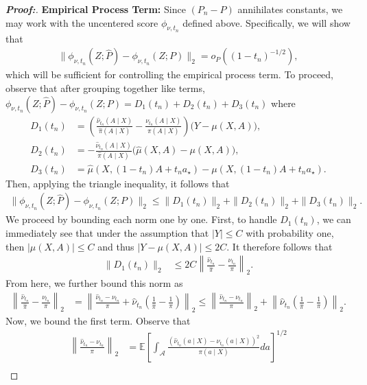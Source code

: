 \documentclass[11pt,twoside]{article}
\theoremstyle{definition}
\theoremstyle{remark}
\begin{document}
\begin{proof}[\textbf{Proof:}]
\textbf{Empirical Process Term:} Since $(P_n-P)$ annihilates constants, we may work with the uncentered score $\phi_{\nu,t_n}$ defined above. Specifically, we will show that
\begin{align*}
    \|\phi_{\nu, t_n}(Z; \widehat{P}) - \phi_{\nu, t_n}(Z; P) \|_2 = o_P\left( (1 - t_n)^{-1/2} \right),
\end{align*}
which will be sufficient for controlling the empirical process term. To proceed, observe that after grouping together like terms, $\phi_{\nu, t_n}(Z; \widehat{P}) - \phi_{\nu, t_n}(Z; P) = D_1(t_n) + D_2(t_n) + D_3(t_n)$  where
\begin{align*}
    D_1(t_n) &= \left(\frac{\widehat{\nu}_{t_n}(A \mid X)}{\widehat{\pi}(A \mid X)} - \frac{\nu_{t_n}(A \mid X)}{\pi(A \mid X)} \right) \Big(Y - \mu(X, A)\Big), \\
    D_2(t_n) &= - \frac{\widehat{\nu}_{t_n}(A \mid X)}{\widehat{\pi}(A \mid X)}\Big( \widehat{\mu}(X, A) - \mu(X, A) \Big),  \\
    D_3(t_n) &= \widehat{\mu}(X, (1-t_n)A + t_n a_{\star}) - \mu(X, (1-t_n)A + t_n a_{\star}).
\end{align*}
Then, applying the triangle inequality, it follows that
\begin{align*}
    \| \phi_{\nu, t_n}(Z; \widehat{P}) - \phi_{\nu, t_n}(Z; P) \|_2 \leq \|D_1(t_n)\|_2 + \|D_2(t_n)\|_2 + \|D_3(t_n)\|_2.
\end{align*}
We proceed by bounding each norm one by one. First, to handle $D_1(t_n)$, we can immediately see that under the assumption that $|Y| \leq C$ with probability one, then $|\mu(X,A)|\leq C$ and thus $|Y-\mu(X,A)|\leq 2C$. It therefore follows that
\begin{align*}
    \|D_1(t_n)\|_2 &\leq 2C \left\| \frac{\widehat\nu_{t_n}}{\widehat\pi} - \frac{\nu_{t_n}}{\pi} \right\|_2.
\end{align*}
From here, we further bound this norm as
\begin{align*}
    \left\| \frac{\widehat{\nu}_{t_n}}{\widehat{\pi}} - \frac{\nu_{t_n}}{\pi} \right\|_2 &= \left\|\frac{\widehat{\nu}_{t_n} - \nu_{t_n}}{\pi} + \widehat{\nu}_{t_n} \left(\frac{1}{\widehat{\pi}} - \frac{1}{\pi}\right)\right\|_2 \leq \left\|\frac{\widehat{\nu}_{t_n} - \nu_{t_n}}{\pi} \right\|_2 + \left\| \widehat{\nu}_{t_n} \left(\frac{1}{\widehat{\pi}} - \frac{1}{\pi}\right)\right\|_2.
\end{align*}
Now, we bound the first term. Observe that
\begin{align*}
    \left\|\frac{\widehat{\nu}_{t_n} - \nu_{t_n}}{\pi} \right\|_2  &= \mathbb{E}\left[ \int_{\mathcal{A}}\frac{(\widehat{\nu}_{t_n}(a \mid X) - \nu_{t_n}(a \mid X))^2}{\pi(a \mid X)} da \right]^{1/2} \\

\end{align*}
\end{proof}
\end{document}
